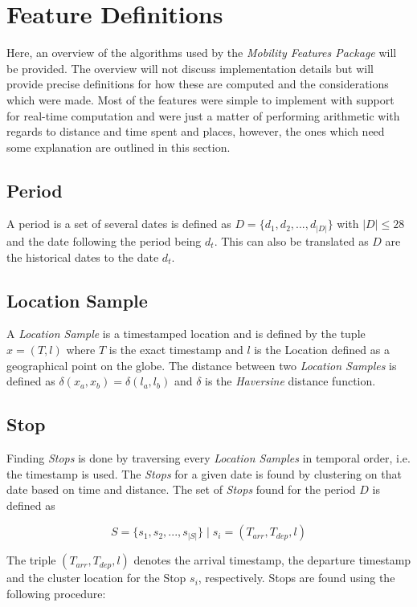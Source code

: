 \section{Feature Definitions}
\label{section:definitions}
Here, an overview of the algorithms used by the \textit{Mobility Features Package} will be provided. The overview will not discuss implementation details but will provide precise definitions for how these are computed and the considerations which were made. Most of the features were simple to implement with support for real-time computation and were just a matter of performing arithmetic with regards to distance and time spent and places, however, the ones which need some explanation are outlined in this section. 

\subsection{Period}
A period is a set of several dates is defined as $D = \{d_1, d_2, ..., d_{|D|}\}$ with $|D| \leq 28$ and the date following the period being $d_t$. This can also be translated as $D$ are the historical dates to the date $d_t$.\\

\subsection{Location Sample}
A \textit{Location Sample} is a timestamped location and is defined by the tuple $x = (T, l)$ where $T$ is the exact timestamp and $l$ is the Location defined as a geographical point on the globe. The distance between two \textit{Location Samples} is defined as $\delta(x_a, x_b) = \delta(l_a, l_b)$ and $\delta$ is the \textit{Haversine} distance function.

\subsection{Stop}
Finding \textit{Stops} is done by traversing every \textit{Location Samples} in temporal order, i.e. the timestamp is used. The \textit{Stops} for a given date is found by clustering  on that date based on time and distance. The set of \textit{Stops} found for the period $D$ is defined as

$$S = \{s_1, s_2, ..., s_{|S|}\} \;| \; s_i = (T_{arr}, T_{dep}, l)$$ 

The triple $(T_{arr}, T_{dep}, l)$ denotes the arrival timestamp, the departure timestamp and the cluster location for the Stop $s_i$, respectively. Stops are found using the following procedure:

